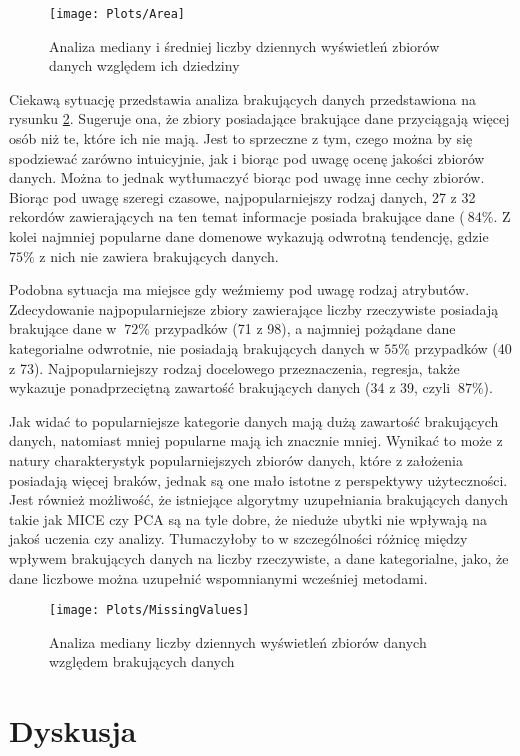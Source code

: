 \begin{figure}[ht]
  \texttt{[image: Plots/Area]}
  \caption{Analiza mediany i średniej liczby dziennych wyświetleń zbiorów danych względem ich dziedziny}
  \label{fig:area}
\end{figure}

Ciekawą sytuację przedstawia analiza brakujących danych przedstawiona na rysunku \ref{fig:missingvalues}.
Sugeruje ona, że zbiory posiadające brakujące dane przyciągają więcej osób niż te, które ich nie mają.
Jest to sprzeczne z tym, czego można by się spodziewać zarówno intuicyjnie, jak i biorąc pod uwagę ocenę jakości zbiorów danych.
Można to jednak wytłumaczyć biorąc pod uwagę inne cechy zbiorów.
Biorąc pod uwagę szeregi czasowe, najpopularniejszy rodzaj danych, 27 z 32 rekordów zawierających na ten temat informacje posiada brakujące dane (\(~84\%\).
Z kolei najmniej popularne dane domenowe wykazują odwrotną tendencję, gdzie \(75\%\) z nich nie zawiera brakujących danych.

Podobna sytuacja ma miejsce gdy weźmiemy pod uwagę rodzaj atrybutów.
Zdecydowanie najpopularniejsze zbiory zawierające liczby rzeczywiste posiadają brakujące dane w \(~72\%\) przypadków (71 z 98), a najmniej pożądane dane kategorialne odwrotnie, nie posiadają brakujących danych w \(55\%\) przypadków (40 z 73).
Najpopularniejszy rodzaj docelowego przeznaczenia, regresja, także wykazuje ponadprzeciętną zawartość brakujących danych (34 z 39, czyli \(~87\%\)).

Jak widać to popularniejsze kategorie danych mają dużą zawartość brakujących danych, natomiast mniej popularne mają ich znacznie mniej.
Wynikać to może z natury charakterystyk popularniejszych zbiorów danych, które z założenia posiadają więcej braków, jednak są one mało istotne z perspektywy użyteczności.
Jest również możliwość, że istniejące algorytmy uzupełniania brakujących danych takie jak MICE czy PCA są na tyle dobre, że nieduże ubytki nie wpływają na jakoś uczenia czy analizy.
Tłumaczyłoby to w szczególności różnicę między wpływem brakujących danych na liczby rzeczywiste, a dane kategorialne, jako, że dane liczbowe można uzupełnić wspomnianymi wcześniej metodami.

\begin{figure}[ht]
  \texttt{[image: Plots/MissingValues]}
  \caption{Analiza mediany liczby dziennych wyświetleń zbiorów danych względem brakujących danych}
  \label{fig:missingvalues}
\end{figure}

\section{Dyskusja}
